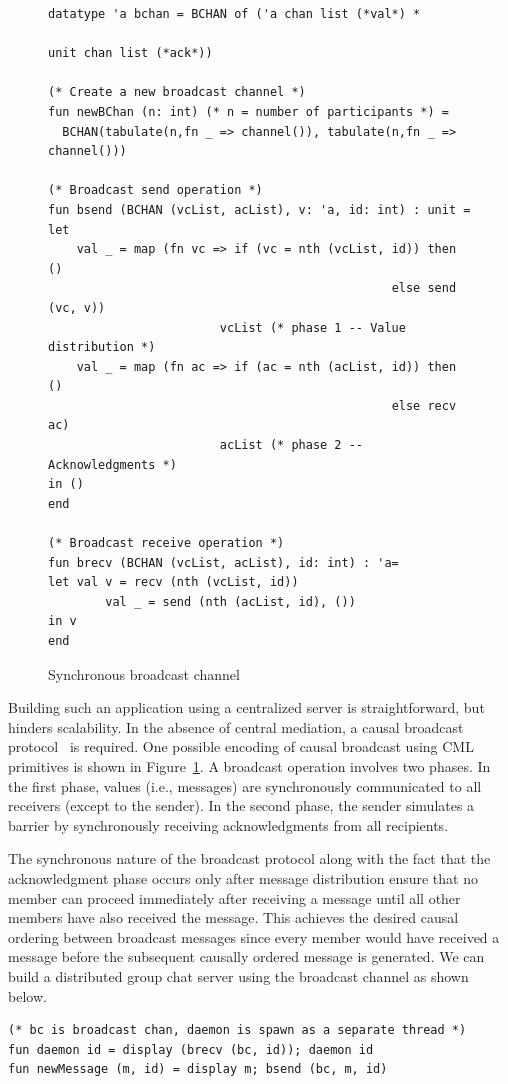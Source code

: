 \begin{figure}
\begin{lstlisting}
datatype 'a bchan = BCHAN of ('a chan list (*val*) *
															unit chan list (*ack*))

(* Create a new broadcast channel *)
fun newBChan (n: int) (* n = number of participants *) =
  BCHAN(tabulate(n,fn _ => channel()), tabulate(n,fn _ => channel()))

(* Broadcast send operation *)
fun bsend (BCHAN (vcList, acList), v: 'a, id: int) : unit =
let
	val _ = map (fn vc => if (vc = nth (vcList, id)) then ()
												else send (vc, v))
						vcList (* phase 1 -- Value distribution *)
	val _ = map (fn ac => if (ac = nth (acList, id)) then ()
												else recv ac)
						acList (* phase 2 -- Acknowledgments *)
in ()
end

(* Broadcast receive operation *)
fun brecv (BCHAN (vcList, acList), id: int) : 'a=
let val v = recv (nth (vcList, id))
		val _ = send (nth (acList, id), ())
in v
end
\end{lstlisting}
\caption{Synchronous broadcast channel}
\label{code:bchan}
\end{figure}

Building such an application using a centralized server is straightforward, but
hinders scalability. In the absence of central mediation, a causal broadcast
protocol~\cite{Birman87} is required. One possible encoding of causal broadcast
using CML primitives is shown in Figure~\ref{code:bchan}. A broadcast operation
involves two phases.  In the first phase, values (i.e., messages) are
synchronously communicated to all receivers (except to the sender).  In the
second phase, the sender simulates a barrier by synchronously receiving
acknowledgments from all recipients.

The synchronous nature of the broadcast protocol along with the fact that the
acknowledgment phase occurs only after message distribution ensure that no
member can proceed immediately after receiving a message until all other
members have also received the message. This achieves the desired causal
ordering between broadcast messages since every member would have received a
message before the subsequent causally ordered message is generated. We can
build a distributed group chat server using the broadcast channel as shown
below.

\lstset{numbers=none}
\begin{lstlisting}
(* bc is broadcast chan, daemon is spawn as a separate thread *)
fun daemon id = display (brecv (bc, id)); daemon id
fun newMessage (m, id) = display m; bsend (bc, m, id)
\end{lstlisting}
\lstset{numbers=left,numberstyle=\tiny,stepnumber=1}

